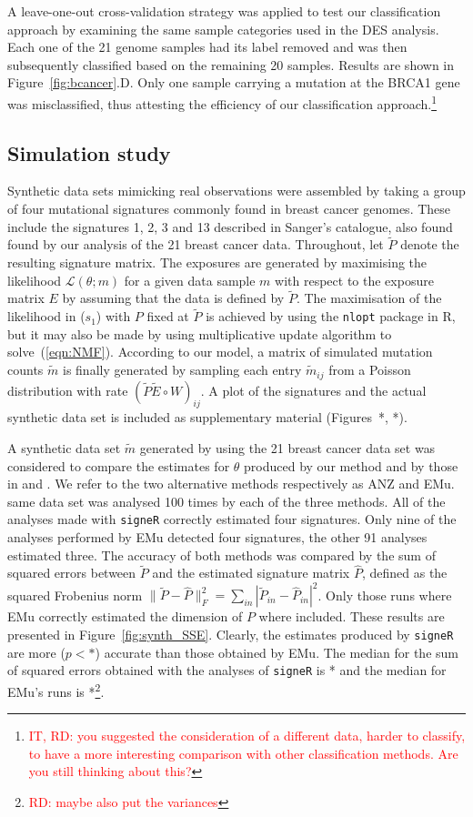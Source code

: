\documentclass{bioinfo}
\begin{document}
A leave-one-out cross-validation strategy was applied to test our
classification approach by examining the same sample categories used
in the DES analysis. Each one of the 21 genome samples had its label
removed and was then subsequently classified based on the remaining 20 
samples.  Results are shown in Figure~\ref{fig:bcancer}.D. Only one
sample carrying a mutation at the BRCA1 gene was misclassified, thus  attesting the efficiency of our
classification approach.\footnote{\textcolor{red}{IT, RD: you suggested
the consideration of a different data, harder to classify, to have a 
more interesting comparison with other classification methods. Are you
still thinking about this?}}

\subsection{Simulation study}
Synthetic data sets mimicking real observations were assembled by
taking a group of four mutational signatures commonly found in breast
cancer genomes. These include the signatures 1, 2, 3 and 13 described
in Sanger's catalogue, also found found by our analysis of the 21
breast cancer data. Throughout, let $\widetilde P$ denote the
resulting signature matrix.  The exposures are generated by maximising
the likelihood $\mathcal L(\theta; m)$ for a given data sample $m$
with respect to the exposure matrix $E$ by assuming that the data is 
defined by $\widetilde P$. The maximisation of the likelihood in
($s_1$) with $P$ fixed at $\widetilde P$ is achieved by using the
\texttt{nlopt} package in R, but it may also be made
by using \cite{LS} multiplicative update algorithm to
solve~(\ref{eqn:NMF}).  According to our model, a matrix of simulated
mutation counts $\widetilde m$ is finally generated by sampling each
entry $\widetilde m_{ij}$ from a Poisson distribution with rate
$(\widetilde P\widetilde E\circ W)_{ij}$. A plot of the signatures and
the actual synthetic data set is included as supplementary material
(Figures~*, *).


A synthetic data set $\widetilde m$ generated by using the 21 breast
cancer data set was considered to compare the estimates for $\theta$
produced by our method and by those in \cite{A} and \cite{FICMV}. We
refer to the two alternative methods respectively as ANZ and EMu.
same data set was analysed 100 times by each of the three methods. All
of the analyses made with \texttt{signeR} correctly estimated four
signatures. Only nine of the analyses performed by EMu detected four
signatures, the other 91 analyses estimated three.  The accuracy of
both methods was compared by the sum of squared errors between
$\widetilde P$ and the estimated signature matrix $\widehat P$,
defined as the squared Frobenius norm $\|\widetilde P - \widehat
P\|_F^2 = \sum_{in} |\widetilde P_{in} - \widehat P_{in}|^2$. Only
those runs where EMu correctly estimated the dimension of $P$ where
included. These results are presented in Figure~\ref{fig:synth_SSE}.
Clearly, the estimates produced by \texttt{signeR} are more ($p<*$)
accurate than those obtained by EMu. The median for the sum of squared
errors obtained with the analyses of \texttt{signeR} is * and the
median for EMu's runs is *\footnote{\textcolor{red}{RD: maybe also put
the variances}}.
\end{document}

